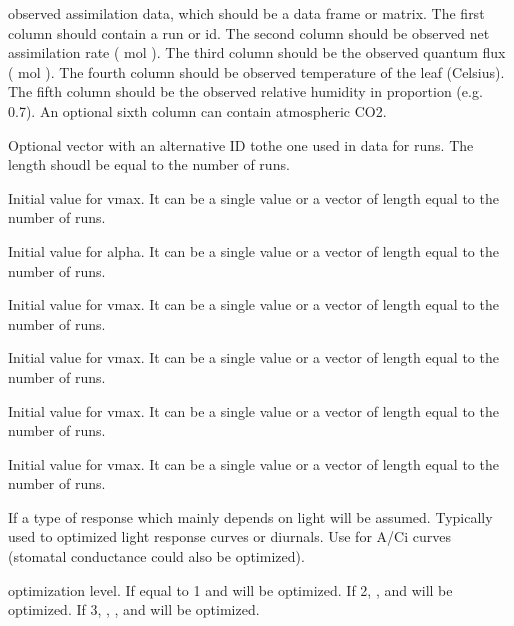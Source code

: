\documentclass[letterpaper]{book}
\begin{document}
\begin{Arguments}
\begin{ldescription}
\item[\code{data}] observed assimilation data, which should be a
data frame or matrix. The first column should contain a
run or id.  The second column should be observed net
assimilation rate (\eqn{\mu}{} mol 
).  The third column should be the observed
quantum flux (\eqn{\mu}{} mol  ).
The fourth column should be observed temperature of the
leaf (Celsius).  The fifth column should be the observed
relative humidity in proportion (e.g. 0.7). An optional
sixth column can contain atmospheric CO2.

\item[\code{ID}] Optional vector with an alternative ID tothe
one used in data for runs. The length shoudl be equal to
the number of runs.

\item[\code{ivmax}] Initial value for vmax. It can be a single
value or a vector of length equal to the number of runs.

\item[\code{ialpha}] Initial value for alpha. It can be a single
value or a vector of length equal to the number of runs.

\item[\code{iRd}] Initial value for vmax. It can be a single
value or a vector of length equal to the number of runs.

\item[\code{ikparm}] Initial value for vmax. It can be a single
value or a vector of length equal to the number of runs.

\item[\code{itheta}] Initial value for vmax. It can be a single
value or a vector of length equal to the number of runs.

\item[\code{ibeta}] Initial value for vmax. It can be a single
value or a vector of length equal to the number of runs.

\item[\code{curve.kind}] If  a type of response which
mainly depends on light will be assumed. Typically used
to optimized light response curves or diurnals. Use
 for A/Ci curves (stomatal conductance could
also be optimized).

\item[\code{op.level}] optimization level. If equal to 1
 and  will be optimized. If 2,
,  and  will be
optimized. If 3, , , 
and  will be optimized.


\end{ldescription}
\end{Arguments}
\end{document}
